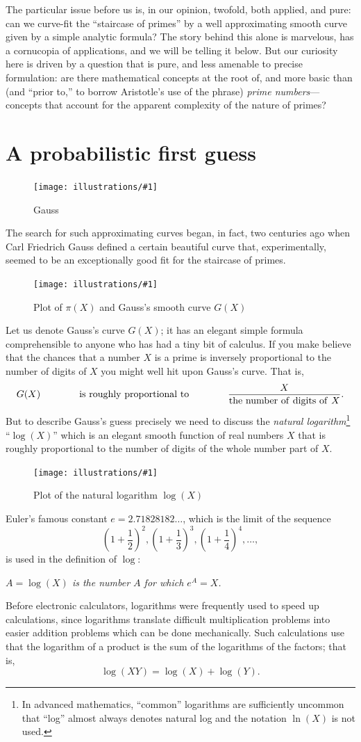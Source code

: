 \documentclass[openany]{book}
\newcommand{\ill}[3]{%
   \begin{figure}[H]%
   \vspace{-2ex}
   \centering%
   \texttt{[image: illustrations/\#1]}%
   \caption{#3}%
   \vspace{-2ex}
    \end{figure}}
\theoremstyle{plain}
\theoremstyle{definition}
\begin{document}
The particular issue before us is, in our opinion, twofold, both
applied, and pure: can we curve-fit the ``staircase of primes'' by a
well approximating smooth curve given by a simple analytic formula?
The story behind this alone is
marvelous, has a cornucopia of applications, and we will be telling it
below. But our curiosity here is driven by a question that is pure,
and less amenable to precise formulation: are there mathematical
concepts at the root of, and more basic than (and ``prior to,'' to
borrow Aristotle's use of the phrase) {\em prime numbers}---concepts
that account for the apparent complexity of the nature of primes?


\chapter{A probabilistic first guess\label{sec:firstguess} }

\ill{gauss}{.3}{Gauss}

The search for such approximating curves began, in fact, two centuries
ago when Carl Friedrich Gauss defined a certain beautiful curve that,
experimentally, seemed to be an exceptionally good fit for the
staircase of primes.

\ill{pi_Li}{.8}{Plot of $\pi(X)$ and Gauss's smooth curve $G(X)$}

Let us denote Gauss's curve $G(X)$; it has an
elegant simple formula comprehensible to anyone who has had a tiny bit
of calculus.  If you make believe that the chances that a number $X$ is
a prime is inversely proportional to the number of digits of $X$ you
might well hit upon Gauss's curve.
That is,
\vskip10pt
$$G(X)\hskip40pt  {\rm is\ roughly\ proportional\ to} \hskip40pt  {\frac{X}{{\rm the\ number\ of\ digits\ of\ } X}}.$$
\vskip10pt
But to describe Gauss's guess precisely we need to discuss the {\it natural logarithm}\footnote{In advanced mathematics, ``common'' logarithms are sufficiently uncommon that ``log'' almost always denotes natural
log and the notation $\ln(X)$ is not used.} ``$\log(X)$'' which is an elegant
smooth function of real numbers $X$ that is roughly proportional
to the number of digits of the whole number part of $X$.



\ill{log}{.8}{Plot of the natural logarithm $\log(X)$}

 Euler's famous constant $e=2.71828182\ldots$, which is the limit
 of the sequence
 $$\left(1+{\frac{1}{2}}\right)^2,
       \left(1+{\frac{1}{3}}\right)^3,
       \left(1+{\frac{1}{4}}\right)^4, \dots,$$
is used in the definition of $\log$:
\begin{center}
{\em $A = \log(X)$ is the number $A$ for which $e^A = X$.}
\end{center}
Before electronic calculators, logarithms were frequently used to
speed up calculations, since logarithms translate difficult multiplication
problems into easier addition problems which can be done mechanically.
Such calculations use that the logarithm of a product is the sum of the logarithms
of the factors; that is, $$\log(X Y) = \log(X) + \log(Y).$$
\end{document}
